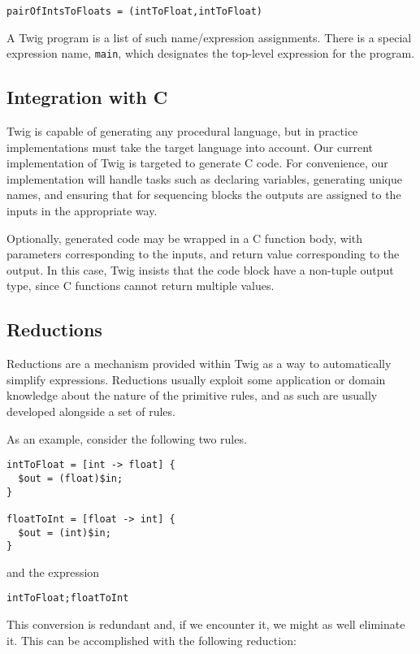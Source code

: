 \begin{verbatim}
pairOfIntsToFloats = (intToFloat,intToFloat)
\end{verbatim}

A Twig program is a list of such name/expression assignments. There is a
special expression name, \texttt{main}, which designates the top-level
expression for the program.

\subsection{Integration with C}
\label{twig:concrete-code-gen}

Twig is capable of generating any procedural language, but in practice
implementations must take the target language into account. Our current
implementation of Twig is targeted to generate C code. For convenience, our
implementation will handle tasks such as declaring variables, generating
unique names, and ensuring that for sequencing blocks the outputs are assigned
to the inputs in the appropriate way. 

Optionally, generated code may be wrapped in a C function body, with
parameters corresponding to the inputs, and return value corresponding to the
output. In this case, Twig insists that the code block have a non-tuple output
type, since C functions cannot return multiple values.

\subsection{Reductions}

Reductions are a mechanism provided within Twig as a way to automatically
simplify expressions. Reductions usually exploit some application or domain
knowledge about the nature of the primitive rules, and as such are usually
developed alongside a set of rules.

As an example, consider the following two rules.

\begin{verbatim}
intToFloat = [int -> float] {
  $out = (float)$in;
}

floatToInt = [float -> int] {
  $out = (int)$in;
}
\end{verbatim}

and the expression

\begin{verbatim}
intToFloat;floatToInt
\end{verbatim}

This conversion is redundant and, if we encounter it, we might as well
eliminate it. This can be accomplished with the following reduction:


